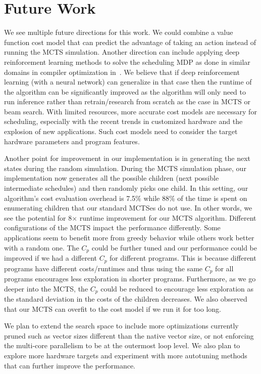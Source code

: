 \section{Future Work}
We see multiple future directions for this work. We could combine a value function cost model that can predict the advantage of taking an action instead of running the MCTS simulation. Another direction can include applying deep reinforcement learning methods to solve the scheduling MDP as done in similar domains in compiler optimization in~\cite{haj2020autophase,haj2020neurovectorizer,huang2019autophase, ahn2019reinforcement}. We believe that if deep reinforcement learning (with a neural network) can generalize in that case then the runtime of the algorithm can be significantly improved as the algorithm will only need to run inference rather than retrain/research from scratch as the case in MCTS or beam search.
With limited resources, more accurate cost models are necessary for scheduling,  especially with the recent trends in customized hardware and the explosion of new applications. Such cost models need to consider the target hardware parameters and program features.

Another point for improvement in our implementation is in generating the next states during the random simulation. During the MCTS simulation phase, our implementation now generates all the possible children (next possible intermediate schedules) and then randomly picks one child. In this setting, our algorithm's cost evaluation overhead is 7.5\%  while 88\% of the time is spent on enumerating children that our standard MCTSes do not use. In other words, we see the potential for 8$\times$ runtime improvement for our MCTS algorithm. Different configurations of the MCTS impact the performance differently. Some applications seem to benefit more from greedy behavior while others work better with a random one. The $C_p$ could be further tuned and our performance could be improved if we had a different $C_p$ for different programs. This is because different programs have different costs/runtimes and thus using the same $C_p$ for all programs encourages less exploration in shorter programs. Furthermore, as we go deeper into the MCTS, the $C_p$ could be reduced to encourage less exploration as the standard deviation in the costs of the children decreases. We also observed that our MCTS can overfit to the cost model if we run it for too long. 

We plan to extend the search space to include more optimizations currently pruned such as vector sizes different than the native vector size, or not enforcing the multi-core parallelism to be at the outermost loop level. We also plan to explore more hardware targets and experiment with more autotuning methods that can further improve the performance.